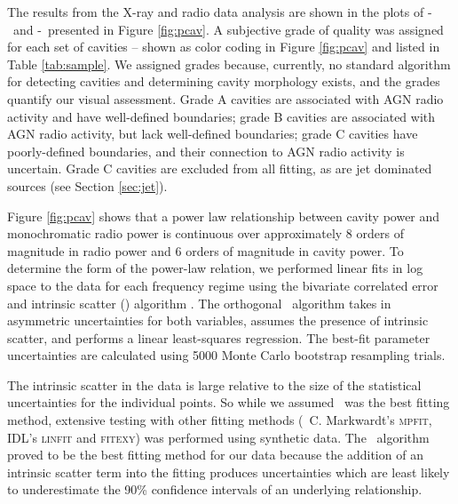 \documentclass{emulateapj}
\begin{document}
The results from the X-ray and radio data analysis are shown in the
plots of \pcav-\phigh\ and \pcav-\plow\ presented in Figure
\ref{fig:pcav}. A subjective grade of quality was assigned for each
set of cavities -- shown as color coding in Figure \ref{fig:pcav} and
listed in Table \ref{tab:sample}. We assigned grades because,
currently, no standard algorithm for detecting cavities and
determining cavity morphology exists, and the grades quantify our
visual assessment. Grade A cavities are associated with AGN radio
activity and have well-defined boundaries; grade B cavities are
associated with AGN radio activity, but lack well-defined boundaries;
grade C cavities have poorly-defined boundaries, and their connection
to AGN radio activity is uncertain. Grade C cavities are excluded from
all fitting, as are jet dominated sources (see Section \ref{sec:jet}).

Figure \ref{fig:pcav} shows that a power law relationship between
cavity power and monochromatic radio power is continuous over
approximately 8 orders of magnitude in radio power and 6 orders of
magnitude in cavity power. To determine the form of the power-law
relation, we performed linear fits in log space to the data for each
frequency regime using the bivariate correlated error and intrinsic
scatter (\bces) algorithm \citep{bces}. The orthogonal
\bces\ algorithm takes in asymmetric uncertainties for both variables,
assumes the presence of intrinsic scatter, and performs a linear
least-squares regression. The best-fit parameter uncertainties are
calculated using 5000 Monte Carlo bootstrap resampling trials.

The intrinsic scatter in the data is large relative to the size of the
statistical uncertainties for the individual points. So while we
assumed \bces\ was the best fitting method, extensive testing with
other fitting methods (\ie\ C. Markwardt's {\textsc{mpfit}}, IDL's
{\textsc{linfit}} and {\textsc{fitexy}}) was performed using synthetic
data. The \bces\ algorithm proved to be the best fitting method for
our data because the addition of an intrinsic scatter term into the
fitting produces uncertainties which are least likely to underestimate
the 90\% confidence intervals of an underlying relationship.
\end{document}
